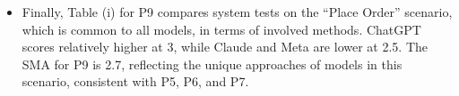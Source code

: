 \begin{itemize}
	\item Finally, Table (i) for P9 compares system tests on the ``Place Order'' scenario, which is common to all models, in terms of involved methods. ChatGPT scores relatively higher at 3, while Claude and Meta are lower at 2.5. The SMA for P9 is 2.7, reflecting the unique approaches of models in this scenario, consistent with P5, P6, and P7.
\end{itemize}